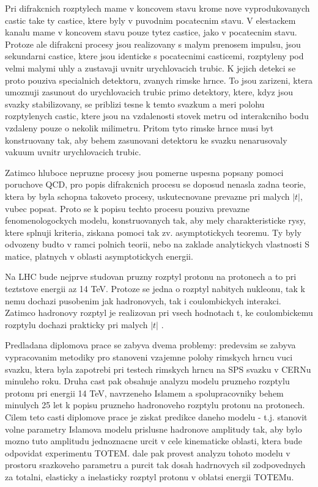 Pri difrakcnich rozptylech mame v koncovem stavu krome nove vyprodukovanych castic take ty castice, ktere byly v puvodnim pocatecnim stavu. V elestackem kanalu mame v koncovem stavu pouze tytez castice, jako v pocatecnim stavu. Protoze ale difrakcni procesy jsou realizovany s malym prenosem impulsu, jsou sekundarni castice, ktere jsou identicke s pocatecnimi casticemi, rozptyleny pod velmi malymi uhly a zustavaji uvnitr urychlovacich trubic. K jejich detekci se proto pouziva specialnich detektoru, zvanych rimske hrnce. To jsou zarizeni, ktera umoznuji zasunout do urychlovacich trubic primo detektory, ktere, kdyz jsou svazky stabilizovany, se priblizi tesne k temto svazkum a meri polohu rozptylenych castic, ktere jsou na vzdalenosti stovek metru od interakcniho bodu vzdaleny pouze o nekolik milimetru. Pritom tyto rimske hrnce musi byt konstruovany tak, aby behem zasunovani detektoru ke svazku nenarusovaly vakuum uvnitr urychlovacich trubic.

Zatimco hluboce nepruzne procesy jsou pomerne uspesna popsany pomoci poruchove QCD, pro popis difrakcnich procesu se doposud nenasla zadna teorie, ktera by byla schopna takoveto procesy, uskutecnovane prevazne pri malych $|t|$, vubec popsat. Proto se k popisu techto procesu pouziva prevazne fenomenologockych modelu, konstruovanych tak, aby mely charakteristicke rysy, ktere splnuji kriteria, ziskana pomoci tak zv. asymptotickych teoremu. Ty byly odvozeny budto v ramci polnich teorii, nebo na zaklade analytickych vlastnosti S matice, platnych v oblasti asymptotickych energii.

Na LHC bude nejprve studovan pruzny rozptyl protonu na protonech a to pri teztstove energii az 14 TeV. Protoze se jedna o rozptyl nabitych nukleonu, tak k nemu dochazi pusobenim jak hadronovych, tak i coulombickych interakci. Zatimco hadronovy rozptyl je realizovan pri vsech hodnotach  t, ke coulombickemu rozptylu dochazi prakticky pri malych $|t|$ .

Predladana diplomova prace se zabyva dvema problemy: predevsim se zabyva vypracovanim metodiky pro stanoveni vzajemne polohy rimskych hrncu vuci svazku, ktera byla zapotrebi pri testech rimskych hrncu na SPS svazku v CERNu minuleho roku. Druha cast pak obsahuje analyzu modelu pruzneho rozptylu protonu pri energii 14 TeV, navrzeneho Islamem a spolupracovniky behem minulych 25 let k popisu pruzneho hadronoveho rozptylu protonu na protonech. Cilem teto casti diplomove prace je ziskat predikce daneho modelu - t.j. stanovit volne parametry Islamova modelu prislusne hadronove amplitudy tak, aby bylo mozno tuto amplitudu jednoznacne urcit v cele kinematicke oblasti, ktera bude odpovidat experimentu TOTEM. dale pak provest analyzu tohoto modelu v prostoru srazkoveho parametru a purcit tak dosah hadrnovych sil zodpovednych za totalni, elasticky a inelasticky rozptyl protonu v oblatsi energii TOTEMu.
\fi

